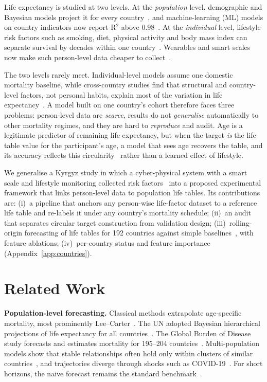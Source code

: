 \documentclass[runningheads]{llncs}
\begin{document}
Life expectancy is studied at two levels. At the \emph{population} level, demographic and
Bayesian models project it for every country~\cite{raftery2013,foreman2018,schumacher2025}, and
machine-learning (ML) models on country indicators now report R$^2$ above
0.98~\cite{chinthaginjala2026a,chinthaginjala2026b,ahamad2025}. At the \emph{individual} level,
lifestyle risk factors such as smoking, diet, physical activity and body mass index can separate
survival by decades within one country~\cite{jackowska2024}. Wearables and smart scales now make
such person-level data cheaper to collect~\cite{bopushova2026}.

The two levels rarely meet. Individual-level models assume one domestic mortality baseline, while
cross-country studies find that structural and country-level factors, not personal habits,
explain most of the variation in life
expectancy~\cite{chinthaginjala2026b,vladimirskaya2023,visbal2026}. A model built on one country's
cohort therefore faces three problems: person-level data are \emph{scarce}, results do not
\emph{generalise} automatically to other mortality regimes, and they are hard to \emph{reproduce}
and audit. Age is a legitimate predictor of remaining life expectancy, but when the target
\emph{is} the life-table value for the participant's age, a model that sees age recovers the table,
and its accuracy reflects this circularity~\cite{kaufman2012} rather than a learned effect of
lifestyle.

We generalise a Kyrgyz study in which a cyber-physical system with a smart scale and lifestyle
monitoring collected risk factors~\cite{bopushova2026} into a proposed experimental framework that
links person-level data to population life tables. Its contributions are:
(i)~a pipeline that anchors any person-wise life-factor dataset to a reference life table and
re-labels it under any country's mortality schedule;
(ii)~an audit that separates circular target construction from validation design;
(iii)~rolling-origin forecasting of life tables for 192 countries against simple
baselines~\cite{hyndman2021}, with feature ablations;
(iv)~per-country status and feature importance (Appendix~\ref{app:countries}).

\section{Related Work}

\textbf{Population-level forecasting.} Classical methods extrapolate age-specific mortality, most
prominently Lee--Carter~\cite{leecarter1992}. The UN adopted Bayesian hierarchical projections of
life expectancy for all countries~\cite{raftery2013}. The Global Burden of Disease study forecasts
and estimates mortality for 195--204 countries~\cite{foreman2018,schumacher2025}. Multi-population
models show that stable relationships often hold only within clusters of similar
countries~\cite{levantesi2023}, and trajectories diverge through shocks such as
COVID-19~\cite{aburto2022}. For short horizons, the naive forecast remains the standard
benchmark~\cite{hyndman2021}.
\end{document}
